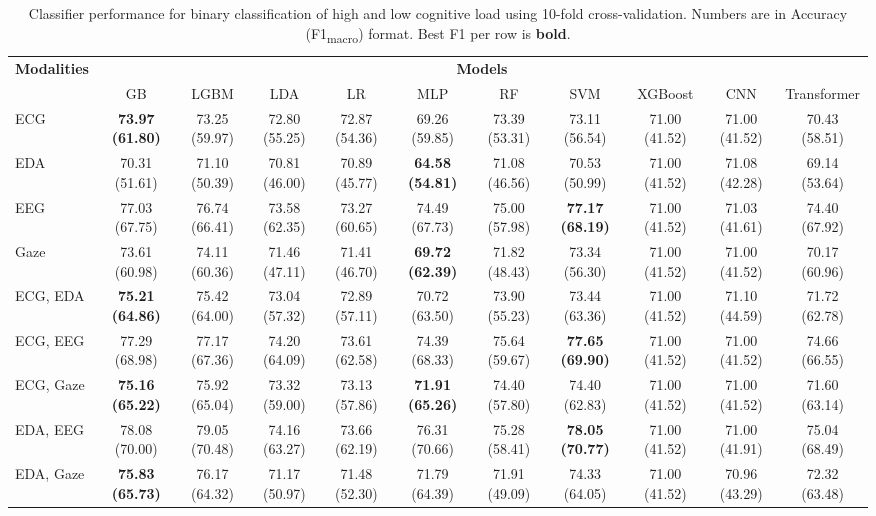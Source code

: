 \begin{table}[!htbp]
  \centering
  \scriptsize
  \setlength{\tabcolsep}{3pt}
  \caption{Classifier performance for binary classification of high and low cognitive load using 10-fold cross-validation. Numbers are in Accuracy (F1\textsubscript{macro}) format. Best F1 per row is \textbf{bold}.}
  \label{tab:results_10fold}
  \begin{tabular}{lcccccccccc}
    \toprule
    \textbf{Modalities} & \multicolumn{10}{c}{\textbf{Models}} \\
    \cmidrule(l){2-11}
    & GB & LGBM & LDA & LR & MLP & RF & SVM & XGBoost & CNN & Transformer \\
    \midrule
    ECG & \textbf{73.97 (61.80)} & 73.25 (59.97) & 72.80 (55.25) & 72.87 (54.36) & 69.26 (59.85) & 73.39 (53.31) & 73.11 (56.54) & 71.00 (41.52) & 71.00 (41.52) & 70.43 (58.51) \\
    EDA & 70.31 (51.61) & 71.10 (50.39) & 70.81 (46.00) & 70.89 (45.77) & \textbf{64.58 (54.81)} & 71.08 (46.56) & 70.53 (50.99) & 71.00 (41.52) & 71.08 (42.28) & 69.14 (53.64) \\
    EEG & 77.03 (67.75) & 76.74 (66.41) & 73.58 (62.35) & 73.27 (60.65) & 74.49 (67.73) & 75.00 (57.98) & \textbf{77.17 (68.19)} & 71.00 (41.52) & 71.03 (41.61) & 74.40 (67.92) \\
    Gaze & 73.61 (60.98) & 74.11 (60.36) & 71.46 (47.11) & 71.41 (46.70) & \textbf{69.72 (62.39)} & 71.82 (48.43) & 73.34 (56.30) & 71.00 (41.52) & 71.00 (41.52) & 70.17 (60.96) \\
    \midrule
    ECG, EDA & \textbf{75.21 (64.86)} & 75.42 (64.00) & 73.04 (57.32) & 72.89 (57.11) & 70.72 (63.50) & 73.90 (55.23) & 73.44 (63.36) & 71.00 (41.52) & 71.10 (44.59) & 71.72 (62.78) \\
    ECG, EEG & 77.29 (68.98) & 77.17 (67.36) & 74.20 (64.09) & 73.61 (62.58) & 74.39 (68.33) & 75.64 (59.67) & \textbf{77.65 (69.90)} & 71.00 (41.52) & 71.00 (41.52) & 74.66 (66.55) \\
    ECG, Gaze & \textbf{75.16 (65.22)} & 75.92 (65.04) & 73.32 (59.00) & 73.13 (57.86) & \textbf{71.91 (65.26)} & 74.40 (57.80) & 74.40 (62.83) & 71.00 (41.52) & 71.00 (41.52) & 71.60 (63.14) \\
    EDA, EEG & 78.08 (70.00) & 79.05 (70.48) & 74.16 (63.27) & 73.66 (62.19) & 76.31 (70.66) & 75.28 (58.41) & \textbf{78.05 (70.77)} & 71.00 (41.52) & 71.00 (41.91) & 75.04 (68.49) \\
    EDA, Gaze & \textbf{75.83 (65.73)} & 76.17 (64.32) & 71.17 (50.97) & 71.48 (52.30) & 71.79 (64.39) & 71.91 (49.09) & 74.33 (64.05) & 71.00 (41.52) & 70.96 (43.29) & 72.32 (63.48) \\

\end{tabular}
\end{table}
